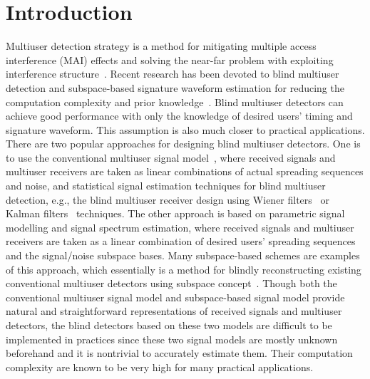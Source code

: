 \documentclass[a4paper,10pt,fleqn, twocolumn]{IEEETran}
\begin{document}
\section{Introduction}
Multiuser detection strategy is a method for mitigating multiple
access interference (MAI) effects and solving the near-far problem
with exploiting interference structure~\cite{Verd98}. Recent
research has been devoted to blind multiuser detection and
subspace-based signature waveform estimation for reducing the
computation complexity and prior
knowledge~\cite{Madh94,Honi95,Torl97,Wang98,Wang99,Zhang02}. Blind
multiuser detectors can achieve good performance with only the
knowledge of desired users' timing and signature waveform. This
assumption is also much closer to practical applications. There
are two popular approaches for designing blind multiuser
detectors. One is to use the conventional multiuser signal
model~\cite{Verd98}, where received signals and multiuser
receivers are taken as linear combinations of actual spreading
sequences and noise, and statistical signal estimation techniques
for blind multiuser detection, e.g., the blind multiuser receiver
design using Wiener filters~\cite{Madh94,Honi95} or Kalman
filters~\cite{Zhang02} techniques. The other approach is based on
parametric signal modelling and signal spectrum estimation, where
received signals and multiuser receivers are taken as a linear
combination of desired users' spreading sequences and the
signal/noise subspace bases. Many subspace-based schemes are
examples of this approach, which essentially is a method for
blindly reconstructing existing conventional multiuser detectors
using subspace concept~\cite{Wang98,Wang99}. Though both the
conventional multiuser signal model and subspace-based signal
model provide natural and straightforward representations of
received signals and multiuser detectors, the blind detectors
based on these two models are difficult to be implemented in
practices since these two signal models are mostly unknown
beforehand and it is nontrivial to accurately estimate them. Their
computation complexity are known to be very high for many
practical applications.
\end{document}
